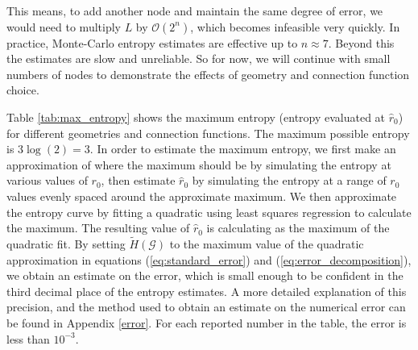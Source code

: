 \documentclass{article}
\begin{document}
This means, to add another node and maintain the same degree of error, we would need to multiply $L$ by $\mathcal{O}(2^n)$, which becomes infeasible very quickly. In practice, Monte-Carlo entropy estimates are effective up to $n \approx 7$. Beyond this the estimates are slow and unreliable. So for now, we will continue with small numbers of nodes to demonstrate the effects of geometry and connection function choice. \newline

Table \ref{tab:max_entropy} shows the maximum entropy (entropy evaluated at $\hat{r}_0$) for different geometries and connection functions. The maximum possible entropy is $3\log(2) = 3$. In order to estimate the maximum entropy, we first make an approximation of where the maximum should be by simulating the entropy at various values of $r_0$, then estimate $\hat{r}_0$ by simulating the entropy at a range of $r_0$ values evenly spaced around the approximate maximum. We then approximate the entropy curve by fitting a quadratic using least squares regression to calculate the maximum. The resulting value of $\hat{r}_0$ is calculating as the maximum of the quadratic fit. By setting $\tilde{H}(\mathcal{G})$ to the maximum value of the quadratic approximation in equations (\ref{eq:standard_error}) and (\ref{eq:error_decomposition}), we obtain an estimate on the error, which is small enough to be confident in the third decimal place of the entropy estimates.  A more detailed explanation of this precision, and the method used to obtain an estimate on the numerical error can be found in Appendix \ref{error}. For each reported number in the table, the error is less than $10^{-3}$. 
\end{document}
